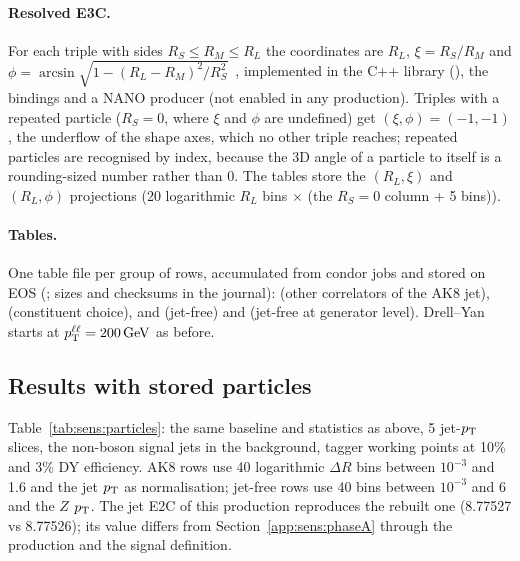 \paragraph{Resolved E3C.} For each triple with sides $R_S \le R_M \le R_L$ the coordinates are $R_L$,
$\xi = R_S/R_M$ and $\phi = \arcsin\sqrt{1 - (R_L - R_M)^2/R_S^2}$~\cite[Eq.~(3)]{Komiske:2022enw}, implemented in the
C++ library (), the bindings and a NANO producer (not enabled in any production). Triples with
a repeated particle ($R_S = 0$, where $\xi$ and $\phi$ are undefined) get $(\xi, \phi) = (-1, -1)$, the underflow of the
shape axes, which no other triple reaches; repeated particles are recognised by index, because the 3D angle of a particle
to itself is a rounding-sized number rather than 0. The tables store the $(R_L, \xi)$ and $(R_L, \phi)$ projections
(20 logarithmic $R_L$ bins $\times$ (the $R_S = 0$ column + 5 bins)).

\paragraph{Tables.} One table file per group of rows, accumulated from condor jobs and stored on EOS
(; sizes and checksums in the journal):
 (other correlators of the AK8 jet),  (constituent choice),  and 
(jet-free) and  (jet-free at generator level). Drell--Yan starts at $p_{\mathrm{T}}^{\ell\ell} = 200\,\mathrm{GeV}$ as before.

\subsection{Results with stored particles}
\label{app:sens:particleResults}

Table~\ref{tab:sens:particles}: the same baseline and statistics as above, 5 jet-$p_{\mathrm{T}}$ slices, the non-boson signal jets
in the background, tagger working points at 10\% and 3\% DY efficiency. AK8 rows use 40 logarithmic $\Delta R$ bins
between $10^{-3}$ and 1.6 and the jet $p_{\mathrm{T}}$ as normalisation; jet-free rows use 40 bins between $10^{-3}$ and 6 and the
$Z$ $p_{\mathrm{T}}$. The jet E2C of this production reproduces the rebuilt one (8.77527 vs 8.77526); its value differs from
Section~\ref{app:sens:phaseA} through the production and the signal definition.

